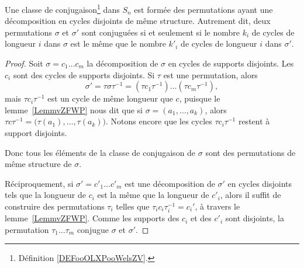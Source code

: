 \begin{proposition} \label{PropEAHWXwe}
    Une classe de conjugaison\footnote{Définition \ref{DEFooOLXPooWelsZV}.} dans \( S_n\) est formée des permutations ayant une décomposition en cycles disjoints de même structure. Autrement dit, deux permutations \( \sigma\) et \( \sigma'\) sont conjuguées si et seulement si le nombre \( k_i\) de cycles de longueur \( i\) dans \( \sigma\) est le même que le nombre \( k'_i\) de cycles de longueur \( i\) dans \( \sigma'\).
\end{proposition}

\begin{proof}
    Soit \( \sigma=c_1\ldots c_m\) la décomposition de \( \sigma\) en cycles de supports disjoints. Les \( c_i\) sont des cycles de supports disjoints. Si \( \tau\) est une permutation, alors
    \begin{equation}
        \sigma'=\tau\sigma\tau^{-1}=(\tau c_1\tau^{-1})\ldots (\tau c_m\tau^{-1}),
    \end{equation}
    mais \( \tau c_i\tau^{-1}\) est un cycle de même longueur que \( c\), puisque le lemme~\ref{LemmvZFWP} nous dit que si \( \sigma=(a_1,\ldots, a_k)\), alors \( \tau c\tau^{-1}=\big( \tau(a_1),\ldots, \tau(a_k) \big)\). Notons encore que les cycles \( \tau c_i\tau^{-1}\) restent à support disjoints.

    Donc tous les éléments de la classe de conjugaison de \( \sigma\) sont des permutations de même structure de \( \sigma\).

    Réciproquement, si \( \sigma'=c'_1\ldots c'_m\) est une décomposition de \( \sigma'\) en cycles disjoints tels que la longueur de \( c_i\) est la même que la longueur de \( c'_i\), alors il suffit de construire des permutations \( \tau_i\) telles que \( \tau_i c_i\tau_i^{-1}=c_i'\), à travers le lemme~\ref{LemmvZFWP}. Comme les supports des $c_i$ et des $c'_i$ sont disjoints, la permutation \( \tau_1\ldots \tau_m\) conjugue \( \sigma\) et \( \sigma'\).
\end{proof}

